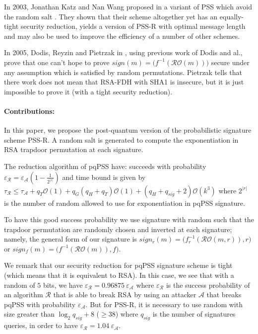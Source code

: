 \documentclass[a4paper,11pt]{article}
\begin{document}
In 2003, Jonathan Katz and Nan Wang proposed in \cite{Katz} a variant of PSS which avoid the random salt . They shown that their scheme altogether yet has an equally-tight security reduction, yields a version of PSS-R with optimal message length and may also be used to improve the efficiency of a number of other schemes.


In 2005, Dodis, Reyzin and Pietrzak in \cite{Dodis2},  using previous work of Dodis and al., prove that one can't hope to prove  $sign(m)=\big(f^{-1}(\mathcal{RO}(m))\big)$ secure under any assumption which is satisfied by random permutations. Pietrzak tells that there work does not mean that  RSA-FDH with SHA1  is insecure,  but it is just impossible to prove it (with a tight security reduction).

\paragraph{Contributions:}
In this paper, we propose the post-quantum version of the probabilistic signature scheme PSS-R.  A random salt is generated to compute the exponentiation in RSA trapdoor permutation at each signature.


The reduction algorithm of pqPSS have: succeeds with probability $\varepsilon_{\mathcal{R}} =\varepsilon_{\mathcal{A}}(1-\frac{1}{2^{|r|}})$ and time bound is given by $\tau_{\mathcal{R}}\leq \tau_{\mathcal{A}} + q_{T}\mathcal{O}(1) + q_{G}(q_{H}+q_{T})\mathcal{O}(1)+ (q_{H}+q_{sig}+2)\mathcal{O}(k^{3})$ where $2^{|r|}$ is the number of random allowed to use for exponentiation in pqPSS signature.


To have this good success probability we use signature with random such that the trapdoor permutation are randomly chosen and inverted at each signature; namely, the general form of our signature is  $sign_{r}(m)=\big(f_{r}^{-1}(\mathcal{RO}(m, r)), r\big)$ or $sign_{f}(m)=\big(f^{-1}(\mathcal{RO}(m)), f\big)$.


We remark that our  security reduction for pqPSS signature scheme is tight (which means that it is equivalent  to RSA). In this case, we see that with a random of $5$ bits, we have $\varepsilon_{\mathcal{R}}=0.96875 \ \varepsilon_{\mathcal{A}}$ where $\varepsilon_{\mathcal{R}}$  is the success probability of an algorithm $\mathcal{R}$ that is able to break RSA by using an attacker $\mathcal{A}$ that breaks pqPSS with probability $\varepsilon_{\mathcal{A}}$. But for PSS-R, it is necessary to use  random with size greater than $\log_{2}q_{sig}+8$ ($\geq 38$) where $q_{sig}$ is the number of signatures queries, in order to have $\varepsilon_{\mathcal{R}}=1.04 \ \varepsilon_{\mathcal{A}}$.
\end{document}
